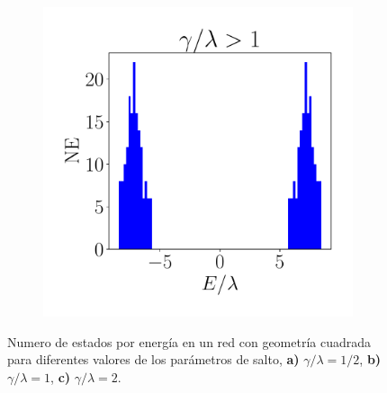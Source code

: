 \begin{figure}[h!]
\begin{subfigure}[b!]{0.3 \textwidth}
         \label{}
     \end{subfigure}\hspace*{1em}
     \begin{subfigure}[b!]{0.3 \textwidth}
         \caption{}
         \includegraphics[width=\textwidth]{Imagenes/Resultados_Hoti_Cuadrado/bars_square3.pdf}
         \label{}
     \end{subfigure}\hspace*{1em}\vspace*{-1.5em}
        \caption{Numero de estados por energía en un red con geometría cuadrada para diferentes valores de los parámetros de salto, \textbf{a)} $\gamma /\lambda = 1/2$, \textbf{b)} $\gamma /\lambda = 1$, \textbf{c)} $\gamma /\lambda = 2$.}
        \label{fig:Dos_Cuadrado}
\end{figure}